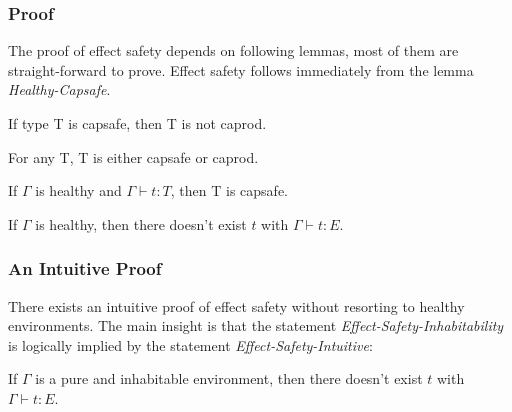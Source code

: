 
\subsubsection{Proof}

The proof of effect safety depends on following lemmas, most of them
are straight-forward to prove. Effect safety follows immediately from
the lemma \emph{Healthy-Capsafe}.


\begin{lemma}
 If type T is capsafe, then T is not caprod.
\end{lemma}

\begin{lemma}
 For any T, T is either capsafe or caprod.
\end{lemma}



\begin{lemma}
  If $\Gamma$ is healthy and $\Gamma \vdash t : T$, then T is capsafe.
\end{lemma}

\begin{theorem}
  If $\Gamma$ is healthy, then there doesn't exist $t$ with
  $\Gamma \vdash t : E$.
\end{theorem}

\subsubsection{An Intuitive Proof}

There exists an intuitive proof of effect safety without resorting to
healthy environments. The main insight is that the statement
\emph{Effect-Safety-Inhabitability} is logically implied by the
statement \emph{Effect-Safety-Intuitive}:

\begin{definition}
  If $\Gamma$ is a pure and inhabitable environment, then there
  doesn't exist $t$ with $\Gamma \vdash t : E$.
\end{definition}

